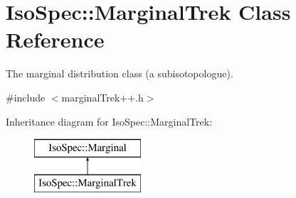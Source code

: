 \hypertarget{class_iso_spec_1_1_marginal_trek}{}\section{Iso\+Spec\+:\+:Marginal\+Trek Class Reference}
\label{class_iso_spec_1_1_marginal_trek}


The marginal distribution class (a subisotopologue).  




{\ttfamily \#include $<$marginal\+Trek++.\+h$>$}

Inheritance diagram for Iso\+Spec\+:\+:Marginal\+Trek\+:\begin{figure}[H]
\begin{center}
\leavevmode
\includegraphics[height=2.000000cm]{class_iso_spec_1_1_marginal_trek}
\end{center}
\end{figure}
